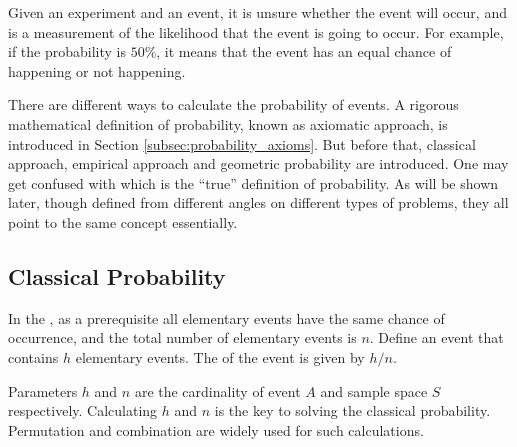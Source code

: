 Given an experiment and an event, it is unsure whether the event will occur, and  is a measurement of the likelihood that the event is going to occur. For example, if the probability is $50\%$, it means that the event has an equal chance of happening or not happening.

There are different ways to calculate the probability of events. A rigorous mathematical definition of probability, known as axiomatic approach, is introduced in Section \ref{subsec:probability_axioms}. But before that, classical approach, empirical approach and geometric probability are introduced. One may get confused with which is the ``true'' definition of probability. As will be shown later, though defined from different angles on different types of problems, they all point to the same concept essentially.

\subsection{Classical Probability}

In the , as a prerequisite all elementary events have the same chance of occurrence, and the total number of elementary events is $n$. Define an event that contains $h$ elementary events. The  of the event is given by $h/n$.

Parameters $h$ and $n$ are the cardinality of event $A$ and sample space $S$ respectively. Calculating $h$ and $n$ is the key to solving the classical probability. Permutation and combination are widely used for such calculations. 

